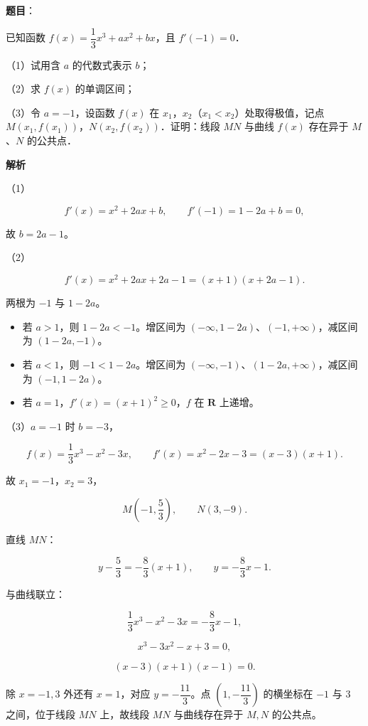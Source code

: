 \begin{answer}

\textbf{题目}：

已知函数 $f(x)=\dfrac13x^3+ax^2+bx$，且 $f'(-1)=0$．

（1）试用含 $a$ 的代数式表示 $b$；

（2）求 $f(x)$ 的单调区间；

（3）令 $a=-1$，设函数 $f(x)$ 在 $x_1$，$x_2$（$x_1<x_2$）处取得极值，记点 $M(x_1,f(x_1))$，$N(x_2,f(x_2))$．证明：线段 $MN$ 与曲线 $f(x)$ 存在异于 $M$、$N$ 的公共点．

\textbf{解析}

（1）

\nopagebreak[4]
\[f'(x)=x^2+2ax+b,\qquad f'(-1)=1-2a+b=0,\]

故 $b=2a-1$。

（2）

\nopagebreak[4]
\[f'(x)=x^2+2ax+2a-1=(x+1)(x+2a-1).\]

两根为 $-1$ 与 $1-2a$。

\begin{itemize}
\item 若 $a>1$，则 $1-2a<-1$。增区间为 $(-\infty,1-2a)$、$(-1,+\infty)$，减区间为 $(1-2a,-1)$。
\item 若 $a<1$，则 $-1<1-2a$。增区间为 $(-\infty,-1)$、$(1-2a,+\infty)$，减区间为 $(-1,1-2a)$。
\item 若 $a=1$，$f'(x)=(x+1)^2\geqslant0$，$f$ 在 $\mathbf R$ 上递增。
\end{itemize}

（3）$a=-1$ 时 $b=-3$，

\nopagebreak[4]
\[f(x)=\frac13x^3-x^2-3x,\qquad f'(x)=x^2-2x-3=(x-3)(x+1).\]

故 $x_1=-1$，$x_2=3$，

\nopagebreak[4]
\[M\left(-1,\frac53\right),\qquad N(3,-9).\]

直线 $MN$：

\nopagebreak[4]
\[y-\frac53=-\frac83(x+1),\qquad y=-\frac83x-1.\]

与曲线联立：

\nopagebreak[4]
\[\frac13x^3-x^2-3x=-\frac83x-1,\]

\nopagebreak[4]
\[x^3-3x^2-x+3=0,\]

\nopagebreak[4]
\[(x-3)(x+1)(x-1)=0.\]

除 $x=-1,3$ 外还有 $x=1$，对应 $y=-\dfrac{11}3$。点 $\left(1,-\dfrac{11}3\right)$ 的横坐标在 $-1$ 与 $3$ 之间，位于线段 $MN$ 上，故线段 $MN$ 与曲线存在异于 $M,N$ 的公共点。


\end{answer}
